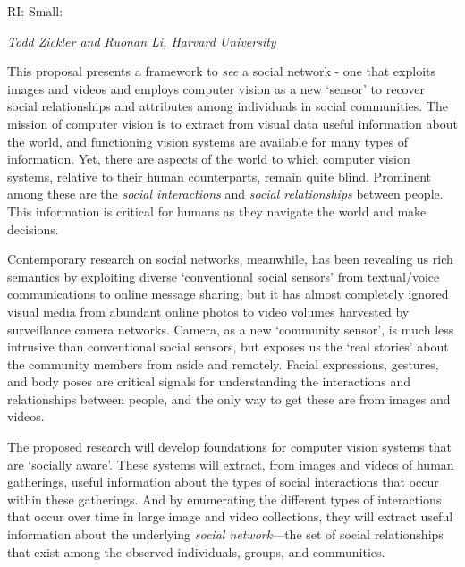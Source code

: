 \pagestyle{empty}

\noindent\textsf{RI: Small:}\vspace{0.9ex}\\

\vspace{1.3ex}
\noindent \textsf{\large \em Todd Zickler and Ruonan Li, Harvard University}
\vspace{2.5ex}

\noindent This proposal presents a framework to \emph{see} a social network - one that exploits images and videos and employs computer vision as a new `sensor' to recover social relationships and attributes among individuals in social communities. The mission of computer vision is to extract from visual data useful information about the world, and functioning vision systems are available for many types of information. Yet, there are aspects of the world to which computer vision systems, relative to their human counterparts, remain quite blind. Prominent among these are the \emph{social interactions} and \emph{social relationships} between people. This information is critical for humans as they navigate the world and make decisions.

Contemporary research on social networks, meanwhile, has been revealing us rich semantics by exploiting diverse `conventional social sensors' from textual/voice communications to online message sharing, but it has almost completely ignored visual media from abundant online photos to video volumes harvested by surveillance camera networks. Camera, as a new `community sensor', is much less intrusive than conventional social sensors, but exposes us the `real stories' about the community members from aside and remotely. Facial expressions, gestures, and body poses are critical signals for understanding the interactions and relationships between people, and the only way to get these are from images and videos. 


The proposed research will develop foundations for computer vision systems that are `socially aware'. These systems will extract, from images and videos of human gatherings, useful information about the types of social interactions that occur within these gatherings. And by enumerating the different types of interactions that occur over time in large image and video collections, they will extract useful information about the underlying \emph{social network}---the set of social relationships that exist among the observed individuals, groups, and communities. 

